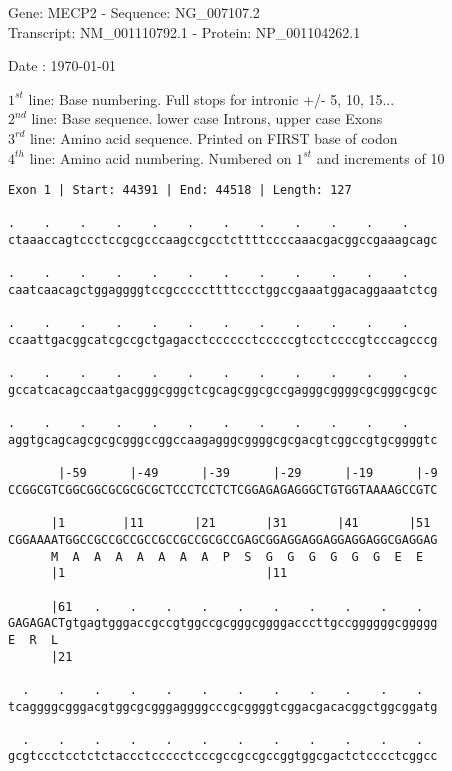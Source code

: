 \documentclass{article}
\begin{document}
\begin{center}
\begin{large}
Gene: MECP2 - Sequence: NG\_007107.2\\
Transcript: NM\_001110792.1 - Protein: NP\_001104262.1
 
 Date : \today
\end{large}
\end{center}
$1^{st}$ line: Base numbering. Full stops for intronic +/- 5, 10, 15...\\
$2^{nd}$ line: Base sequence. lower case Introns, upper case Exons\\
$3^{rd}$ line: Amino acid sequence. Printed on FIRST base of codon\\
$4^{th}$ line: Amino acid numbering. Numbered on $1^{st}$ and increments of 10\\
\begin{Verbatim}[fontfamily=courier]
Exon 1 | Start: 44391 | End: 44518 | Length: 127

.    .    .    .    .    .    .    .    .    .    .    .    
ctaaaccagtccctccgcgcccaagccgcctcttttccccaaacgacggccgaaagcagc

.    .    .    .    .    .    .    .    .    .    .    .    
caatcaacagctggaggggtccgcccccttttccctggccgaaatggacaggaaatctcg

.    .    .    .    .    .    .    .    .    .    .    .    
ccaattgacggcatcgccgctgagacctcccccctcccccgtcctccccgtcccagcccg

.    .    .    .    .    .    .    .    .    .    .    .    
gccatcacagccaatgacgggcgggctcgcagcggcgccgagggcggggcgcgggcgcgc

.    .    .    .    .    .    .    .    .    .    .    .    
aggtgcagcagcgcgcgggccggccaagagggcggggcgcgacgtcggccgtgcggggtc

       |-59      |-49      |-39      |-29      |-19      |-9
CCGGCGTCGGCGGCGCGCGCGCTCCCTCCTCTCGGAGAGAGGGCTGTGGTAAAAGCCGTC

      |1        |11       |21       |31       |41       |51 
CGGAAAATGGCCGCCGCCGCCGCCGCCGCGCCGAGCGGAGGAGGAGGAGGAGGCGAGGAG
      M  A  A  A  A  A  A  A  P  S  G  G  G  G  G  G  E  E  
      |1                            |11                     

      |61   .    .    .    .    .    .    .    .    .    .  
GAGAGACTgtgagtgggaccgccgtggccgcgggcggggacccttgccggggggcggggg
E  R  L                                                     
      |21                                                   

  .    .    .    .    .    .    .    .    .    .    .    .  
tcaggggcgggacgtggcgcgggaggggcccgcggggtcggacgacacggctggcggatg

  .    .    .    .    .    .    .    .    .    .    .    .  
gcgtccctcctctctaccctccccctcccgccgccgccggtggcgactctcccctcggcc

\end{Verbatim}
\end{document}

